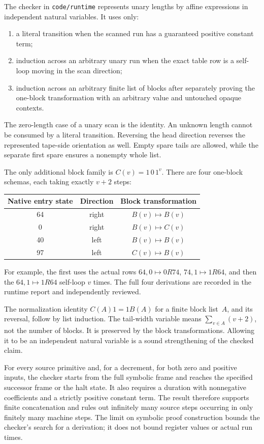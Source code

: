 \documentclass[11pt]{article}
\theoremstyle{definition}\newtheorem{definition}[theorem]{Definition}
\begin{document}
The checker in \texttt{code/runtime} represents unary lengths by affine
expressions in independent natural variables. It uses only:
\begin{enumerate}
\item a literal transition when the scanned run has a guaranteed positive
constant term;
\item induction across an arbitrary unary run when the exact table row
is a self-loop moving in the scan direction;
\item induction across an arbitrary finite list of blocks after separately
proving the one-block transformation with an arbitrary value and untouched
opaque contexts.
\end{enumerate}
The zero-length case of a unary scan is the identity. An unknown length
cannot be consumed by a literal transition. Reversing the head direction
reverses the represented tape-side orientation as well. Empty spare tails
are allowed, while the separate first spare ensures a nonempty whole list.

The only additional block family is $C(v)=1\,0\,1^v$.
There are four one-block schemas, each taking exactly $v+2$ steps:
\begin{center}
\begin{tabular}{ccc}
\toprule
Native entry state & Direction & Block transformation\\\midrule
64 & right & $B(v)\mapsto B(v)$\\
0 & right & $B(v)\mapsto C(v)$\\
40 & left & $B(v)\mapsto B(v)$\\
97 & left & $C(v)\mapsto B(v)$\\
\bottomrule
\end{tabular}
\end{center}
For example, the first uses the actual rows
$64,0\mapsto0R74$, $74,1\mapsto1R64$, and then the
$64,1\mapsto1R64$ self-loop $v$ times. The full four derivations are
recorded in the runtime report and independently reviewed.

The normalization identity $C(A)1=1B(A)$ for a finite block list~$A$,
and its reversal, follow by list induction. The tail-width variable means
$\sum_{v\in A}(v+2)$, not the number of blocks. It is preserved by the
block transformations. Allowing it to be an independent natural variable
is a sound strengthening of the checked claim.

For every source primitive and, for a decrement, for both zero and positive
inputs, the checker starts from the full symbolic frame and reaches the
specified successor frame or the halt state. It also requires a duration
with nonnegative coefficients and a strictly positive constant term. The
result therefore supports finite concatenation and rules out infinitely
many source steps occurring in only finitely many machine steps.
The limit on symbolic proof construction bounds the checker's search for a
derivation; it does not bound register values or actual run times.
\end{document}
